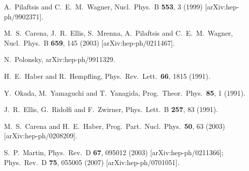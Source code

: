\documentclass[12pt]{article}
\begin{document}
\begin{thebibliography}{9}
  A.~Pilaftsis and C.~E.~M.~Wagner,
  Nucl.\ Phys.\  B {\bf 553}, 3 (1999)
  [arXiv:hep-ph/9902371].

  M.~S.~Carena, J.~R.~Ellis, S.~Mrenna, A.~Pilaftsis and C.~E.~M.~Wagner,
  Nucl.\ Phys.\  B {\bf 659}, 145 (2003)
  [arXiv:hep-ph/0211467].
  
  N.~Polonsky,
  arXiv:hep-ph/9911329.
  

  H.~E.~Haber and R.~Hempfling,
  Phys.\ Rev.\ Lett.\  {\bf 66}, 1815 (1991).

  Y.~Okada, M.~Yamaguchi and T.~Yanagida,
  Prog.\ Theor.\ Phys.\  {\bf 85}, 1 (1991).



  J.~R.~Ellis, G.~Ridolfi and F.~Zwirner,
  Phys.\ Lett.\  B {\bf 257}, 83 (1991).

  M.~S.~Carena and H.~E.~Haber,
  Prog.\ Part.\ Nucl.\ Phys.\  {\bf 50}, 63 (2003)
  [arXiv:hep-ph/0208209].

  S.~P.~Martin,
  Phys.\ Rev.\  D {\bf 67}, 095012 (2003)
  [arXiv:hep-ph/0211366];
  Phys.\ Rev.\  D {\bf 75}, 055005 (2007)
  [arXiv:hep-ph/0701051].



\end{thebibliography}
\end{document}
